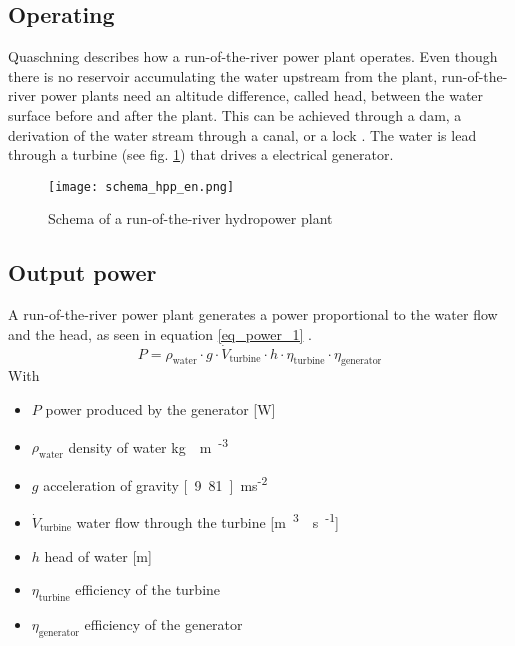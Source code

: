 \subsection{Operating}
Quaschning \cite{quaschning} describes how a run-of-the-river power plant operates. Even though there is no reservoir accumulating the water upstream from the plant, run-of-the-river power plants need an altitude difference, called head, between the water surface before and after the plant. This can be achieved through a dam, a derivation of the water stream through a canal, or a lock \cite{tdi_petites_centrales}. The water is lead through a turbine (see fig. \ref{schema_hpp}) that drives a electrical generator.
\begin{figure}[H]
\centering
\texttt{[image: schema\_hpp\_en.png]}
\caption[Schema of a run-of-the-river hydropower plant]{Schema of a run-of-the-river hydropower plant \cite{quaschning}}
\label{schema_hpp}
\end{figure}
\subsection{Output power}
A run-of-the-river power plant generates a power proportional to the water flow and the head, as seen in equation \ref{eq_power_1} \cite{quaschning}.
\begin{equation}
\label{eq_power_1} 
 P = \rho_\mathrm{water} \cdot g \cdot \dot{V}_\mathrm{turbine} \cdot h \cdot \eta_\mathrm{turbine} \cdot \eta_\mathrm{generator}
\end{equation}
With 
\begin{itemize}
\itemsep0em 
 \item $P$ \tabto{4cm} power produced by the generator \tabto{12cm} [\unit{W}]
 \item $\rho_\mathrm{water}$ \tabto{4cm} density of water \tabto{12cm} \unit[1000]{kg\textperiodcentered m\textsuperscript{-3}}
 \item $g$ \tabto{4cm} acceleration of gravity \tabto{12cm} \unit[9.81]{m\textperiodcentered s\textsuperscript{-2}}
 \item $\dot{V}_\mathrm{turbine}$ \tabto{4cm} water flow through the turbine \tabto{12cm} [\unit{m\textsuperscript{3}\textperiodcentered s\textsuperscript{-1}}]
 \item $h$ \tabto{4cm} head of water \tabto{12cm} [\unit{m}]
 \item $\eta_\mathrm{turbine}$ \tabto{4cm} efficiency of the turbine
 \item $\eta_\mathrm{generator}$ \tabto{4cm} efficiency of the generator
\end{itemize}


